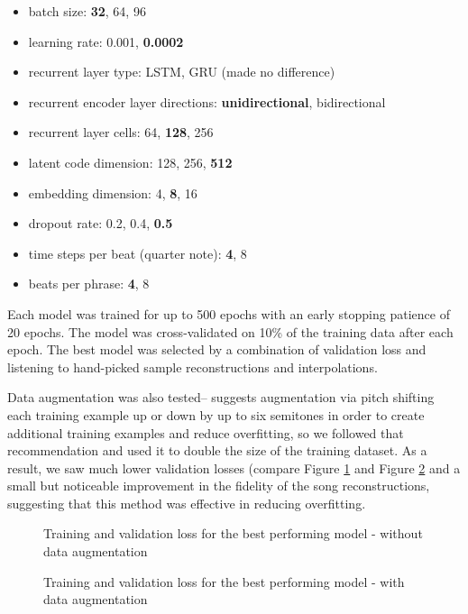 \documentclass[sigconf,authorversion]{acmart}
\providecommand{\tightlist}{%
  \setlength{\itemsep}{0pt}\setlength{\parskip}{0pt}}
\begin{document}
\begin{itemize}
  \tightlist
  \item batch size: \textbf{32}, 64, 96
  \item learning rate: 0.001, \textbf{0.0002}
  \item recurrent layer type: LSTM, GRU (made no difference)
  \item recurrent encoder layer directions: \textbf{unidirectional}, bidirectional
  \item recurrent layer cells: 64, \textbf{128}, 256
  \item latent code dimension: 128, 256, \textbf{512}
  \item embedding dimension: 4, \textbf{8}, 16
  \item dropout rate: 0.2, 0.4, \textbf{0.5}
  \item time steps per beat (quarter note): \textbf{4}, 8
  \item beats per phrase: \textbf{4}, 8
\end{itemize}

Each model was trained for up to 500 epochs with an early stopping
patience of 20 epochs. The model was cross-validated on 10\% of the
training data after each epoch. The best model was selected by a
combination of validation loss and listening to hand-picked sample
reconstructions and interpolations.

Data augmentation was also tested--\cite{oore_this_2018} suggests
augmentation via pitch shifting each training example up or down by up
to six semitones in order to create additional training examples and
reduce overfitting, so we followed that recommendation and used it to
double the size of the training dataset. As a result, we saw much
lower validation losses (compare Figure \ref{loss} and Figure
\ref{loss_augment} and a small but noticeable improvement in the
fidelity of the song reconstructions, suggesting that this method was
effective in reducing overfitting.

\begin{figure}[htbp]
    \begin{center}
        \scalebox{0.5}{}
    \end{center}
    \caption{Training and validation loss for the best performing model - without data augmentation}
    \label{loss}
\end{figure}

\begin{figure}[htbp]
    \begin{center}
        \scalebox{0.5}{}
    \end{center}
    \caption{Training and validation loss for the best performing model - with data augmentation}
    \label{loss_augment}
\end{figure}
\end{document}
